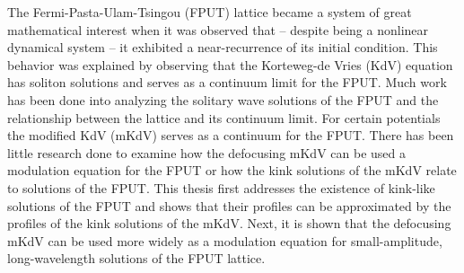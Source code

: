 
The Fermi-Pasta-Ulam-Tsingou (FPUT) lattice became a system of great mathematical interest when it was observed that -- despite being a nonlinear dynamical system -- it exhibited a near-recurrence of its initial condition. This behavior was explained by observing that the Korteweg-de Vries (KdV) equation has soliton solutions and serves as a continuum limit for the FPUT. Much work has been done into analyzing the solitary wave solutions of the FPUT and the relationship between the lattice and its continuum limit. For certain potentials the modified KdV (mKdV) serves as a continuum for the FPUT. There has been little research done to examine how the defocusing mKdV can be used a modulation equation for the FPUT or how the kink solutions of the mKdV relate to solutions of the FPUT. This thesis first addresses the existence of kink-like solutions of the FPUT and shows that their profiles can be approximated by the profiles of the kink solutions of the mKdV. Next, it is shown that the defocusing mKdV can be used more widely as a modulation equation for small-amplitude, long-wavelength solutions of the FPUT lattice.
